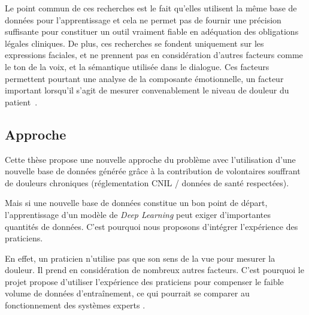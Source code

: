 \documentclass[11pt]{article}
\begin{document}
Le point commun de ces recherches est le fait qu’elles utilisent la même base de
données pour l’apprentissage et cela ne permet pas de fournir une précision
suffisante pour constituer un outil vraiment fiable en adéquation des
obligations légales cliniques. De plus, ces recherches se fondent uniquement sur
les expressions faciales, et ne prennent pas en considération d’autres facteurs
comme le ton de la voix, et la sémantique utilisée dans le dialogue. Ces
facteurs permettent pourtant une analyse de la composante émotionnelle, un facteur
important lorsqu’il s’agit de mesurer convenablement le niveau de douleur du
patient~\cite{hale1997emotional}.   


\subsection{Approche}
\label{sec:org97cce26}


Cette thèse propose une nouvelle approche du problème avec l’utilisation d’une
nouvelle base de données générée grâce à la contribution de volontaires
souffrant de douleurs chroniques (réglementation CNIL / données de santé
respectées).

Mais si une nouvelle base de données constitue un bon point de
départ, l’apprentissage d’un modèle de \emph{Deep Learning} peut exiger d’importantes
quantités de données. C’est pourquoi nous proposons d'intégrer l'expérience
des praticiens. 

En effet, un praticien n'utilise pas que son sens de la vue pour mesurer la
douleur. Il prend en considération de nombreux autres facteurs. C’est pourquoi
le projet propose d’utiliser l’expérience des praticiens pour compenser le
faible volume de données d’entraînement, ce qui pourrait se comparer au
fonctionnement des systèmes experts \cite{giarratano1998expert}. 
\end{document}
